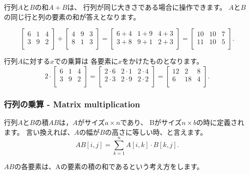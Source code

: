 行列$A$と$B$の和$A+B$は、
行列が同じ大きさである場合に操作できます。
$A$と$B$の同じ行と列の要素の和が答えとなります。

\[
 \begin{bmatrix}
  6 & 1 & 4 \\
  3 & 9 & 2 \\
 \end{bmatrix}
+
 \begin{bmatrix}
  4 & 9 & 3 \\
  8 & 1 & 3 \\
 \end{bmatrix}
=
 \begin{bmatrix}
  6+4 & 1+9 & 4+3 \\
  3+8 & 9+1 & 2+3 \\
 \end{bmatrix}
=
 \begin{bmatrix}
  10 & 10 & 7 \\
  11 & 10 & 5 \\
 \end{bmatrix}.
\]

行列$A$に対する$x$での乗算は
各要素に$x$をかけたものとなります。
\[
 2 \cdot \begin{bmatrix}
  6 & 1 & 4 \\
  3 & 9 & 2 \\
 \end{bmatrix}
=
 \begin{bmatrix}
  2 \cdot 6 & 2\cdot1 & 2\cdot4 \\
  2\cdot3 & 2\cdot9 & 2\cdot2 \\
 \end{bmatrix}
=
 \begin{bmatrix}
  12 & 2 & 8 \\
  6 & 18 & 4 \\
 \end{bmatrix}.
\]

\subsubsection{行列の乗算 - Matrix multiplication}


行列$A$と$B$の積$AB$は，$A$がサイズ$a \times n$であり、
Bがサイズ$n \times b$の時に定義されます。
言い換えれば、$A$の幅が$B$の高さに等しい時、と言えます。
\[
AB[i,j] = \sum_{k=1}^n A[i,k] \cdot B[k,j].
\]

$AB$の各要素は、Aの要素の積の和であるという考え方をします。

